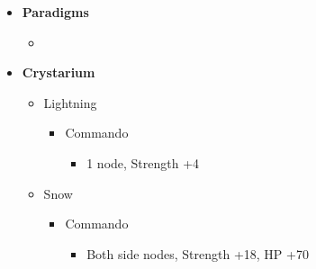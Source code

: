 \begin{paracol}{2}
	\renewcommand{\second}{[2] Solidarity (\com/\sen/\med)}

	\renewcommand{\third}{[3] Aggression (\com/\com/\rav)}

	\renewcommand{\fourth}{[4] Aggression (\com/\com/\rav)}
	\switchcolumn
	\begin{menu}
		\begin{itemize}
			\item \textbf{Paradigms}
			      \begin{itemize}
				      \item {}%
				            {\paradigmline{(\rav)}{\rav}{\rav}}%
				            {\paradigmline{\com}{\sen}{\med}}%
				            {\paradigmline[3]{\textit{[\com]}}{\textit{\com}}{\textit{\rav}}}%
				            {\paradigmline{[\com]}{\com}{\rav}}
			      \end{itemize}
			\item \textbf{Crystarium}
			      \begin{itemize}
				      \item Lightning
				            \begin{itemize}
					            \item Commando
					                  \begin{itemize}
						                  \item 1 node, Strength +4
					                  \end{itemize}
				            \end{itemize}
				      \item Snow
				            \begin{itemize}
					            \item Commando
					                  \begin{itemize}
						                  \item Both side nodes, Strength +18, HP +70
					                  \end{itemize}
				            \end{itemize}
			      \end{itemize}


\end{itemize}
\end{menu}
\end{paracol}
